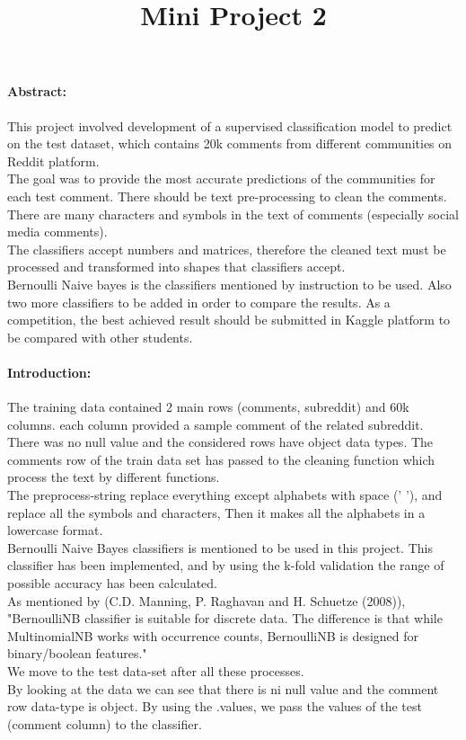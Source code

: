 \documentclass[12pt]{report}
\begin{document}
	\title{Mini Project 2}
	
	
	\paragraph{Abstract:}
	This project involved development of a supervised classification model to predict on the test dataset, which contains 20k comments from different communities on Reddit platform.\\
	The goal was to provide the most accurate predictions of the communities for each test comment.
	There should be text pre-processing to clean the comments. There are many characters and symbols in the text of comments (especially  social media comments).\\
	The classifiers accept numbers and matrices, therefore the cleaned text must be processed and transformed into shapes that classifiers accept. \\
	Bernoulli Naive bayes is the classifiers mentioned by instruction to be used.
	Also two more classifiers to be added in order to compare the results.  
	As a competition, the best achieved result should be submitted in Kaggle platform to be compared with other students. 
	
	
	
	\paragraph{Introduction:}
	The training data contained 2 main rows (comments, subreddit) and 60k columns. each column provided a sample comment of the related subreddit.\\
	There was no null value and the considered rows have object data types.
	The comments row of the train data set has passed to the cleaning function which process the text by different functions.\\
	The preprocess-string replace everything except alphabets with space (' '), and replace all the symbols and characters, Then it makes all the alphabets in a lowercase format. \\
	
	Bernoulli Naive Bayes classifiers is mentioned to be used in this project. This classifier has been implemented, and by using the k-fold validation the range of possible accuracy has been calculated.\\
	As mentioned by (C.D. Manning, P. Raghavan and H. Schuetze (2008)), "BernoulliNB classifier is suitable for discrete data. The difference is that while MultinomialNB works with occurrence counts, BernoulliNB is designed for binary/boolean features." \\
	We move to the test data-set after all these processes. \\
	By looking at the data we can see that there is ni null value and the comment row data-type is object.
	By using the .values, we pass the values of the test (comment column) to the classifier. 
	
\end{document}
